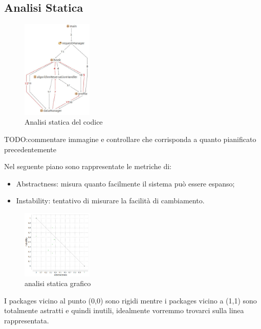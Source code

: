 		
	\subsection{Analisi Statica}
		\begin{figure}[h!]
			\centering
			\includegraphics[width=0.3\textwidth]{Immagini/analisi_statica_package.jpg}
			\caption{Analisi statica del codice}
			\label{fig:analisiStatica}
		\end{figure}
		TODO:commentare immagine e controllare che corrisponda a quanto pianificato precedentemente
		
		
		Nel seguente piano sono rappresentate le metriche di:
		\begin{itemize}
			\item Abstractness: misura quanto facilmente il sistema può essere espanso;
			\item Instability: tentativo di misurare la facilità di cambiamento. 
		\end{itemize}
\newpage
	\begin{figure}[h!]
		\centering
		\includegraphics[width=0.3\textwidth]{Immagini/analisi_statica_grafico1.jpg}
		\caption{analisi statica grafico}
		\label{fig:analisiStaticaGrafico}
	\end{figure}		
I packages vicino al punto (0,0) sono rigidi mentre i packages vicino a (1,1) sono totalmente astratti e quindi inutili, idealmente vorremmo trovarci sulla linea rappresentata.
	
	
	
	
	
	
	
